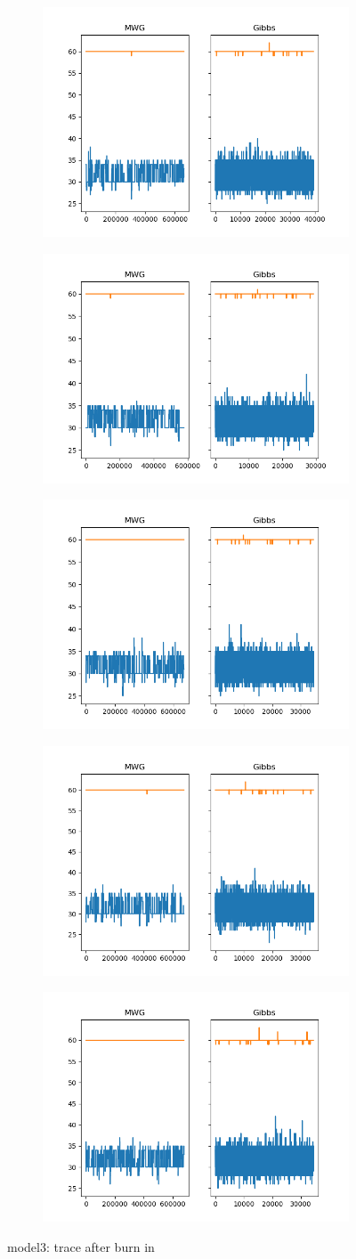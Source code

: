 \begin{figure}[H]
    \centering
    \begin{subfigure}
    	\centering
        \includegraphics[width=0.3\linewidth]{../../plots/Trace_post_burnin_M3_N100_NMCMC3_seed0_diffind2.png}
    \end{subfigure}
    \begin{subfigure}
        \centering
    	\includegraphics[width=0.3\linewidth]{../../plots/Trace_post_burnin_M3_N100_NMCMC3_seed1_diffind2.png}
	\end{subfigure}
	\begin{subfigure}
	    \centering
    	\includegraphics[width=0.3\linewidth]{../../plots/Trace_post_burnin_M3_N100_NMCMC3_seed2_diffind2.png}
	\end{subfigure}
	\begin{subfigure}
	    \centering
    	\includegraphics[width=0.3\linewidth]{../../plots/Trace_post_burnin_M3_N100_NMCMC3_seed3_diffind2.png}
	\end{subfigure}
	\begin{subfigure}
	    \centering
    	\includegraphics[width=0.3\linewidth]{../../plots/Trace_post_burnin_M3_N100_NMCMC3_seed4_diffind2.png}
	\end{subfigure}
	\caption{model3: trace after burn in}
\end{figure}

